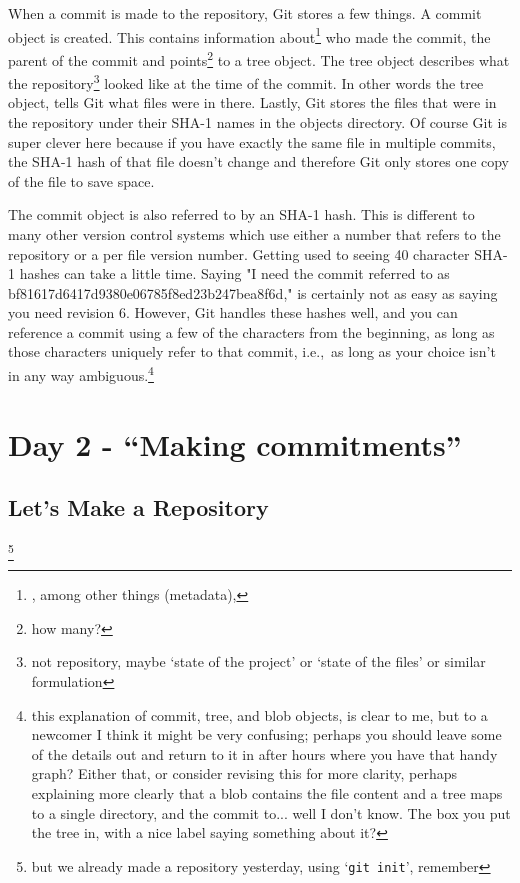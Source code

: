 When a commit is made to the repository, Git stores a few things.
A commit object is created.
This contains information about\footnote{, among other things (metadata),} who made the commit, the parent of the commit and points\footnote{how many?} to a tree object.
The tree object describes what the repository\footnote{not repository, maybe `state of the project' or `state of the files' or similar formulation} looked like at the time of the commit.
In other words the tree object, tells Git what files were in there.
Lastly, Git stores the files that were in the repository under their SHA-1 names in the objects directory.
Of course Git is super clever here because if you have exactly the same file in multiple commits, the SHA-1 hash of that file doesn't change and therefore Git only stores one copy of the file to save space.

The commit object is also referred to by an SHA-1 hash.
This is different to many other version control systems which use either a number that refers to the repository or a per file version number.
Getting used to seeing 40 character SHA-1 hashes can take a little time.
Saying "I need the commit referred to as bf81617d6417d9380e06785f8ed23b247bea8f6d," is certainly not as easy as saying you need revision 6.
However, Git handles these hashes well, and you can reference a commit using a few of the characters from the beginning, as long as those characters uniquely refer to that commit, i.e.,\ as long as your choice isn't in any way ambiguous.\footnote{this explanation of commit, tree, and blob objects, is clear to me, but to a newcomer I think it might be very confusing; perhaps you should leave some of the details out and return to it in after hours where you have that handy graph? Either that, or consider revising this for more clarity, perhaps explaining more clearly that a blob contains the file content and a tree maps to a single directory, and the commit to... well I don't know. The box you put the tree in, with a nice label saying something about it?}

\section{Day 2 - ``Making commitments''}
\subsection{Let's Make a Repository}
\footnote{but we already made a repository yesterday, using `\texttt{git init}', remember}

